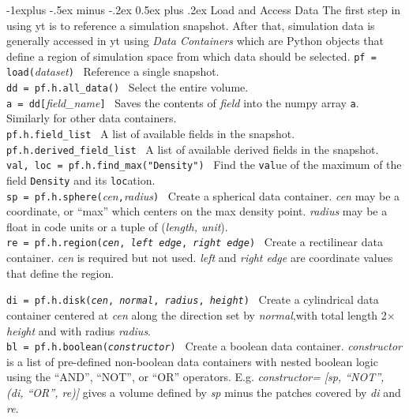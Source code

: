 \documentclass[10pt,landscape]{article}
\makeatletter
\renewcommand{\subsection}{\@startsection{subsection}{2}{0mm}%
                                {-1explus -.5ex minus -.2ex}%
                                {0.5ex plus .2ex}%
                                {\normalfont\normalsize\bfseries}}
\makeatother
\begin{document}
\begin{multicols}{3}
\subsection{Load and Access Data}
The first step in using yt is to reference a simulation snapshot.
After that, simulation data is generally accessed in yt using {\it Data Containers} which are Python objects
that define a region of simulation space from which data should be selected.
\texttt{pf = load(}{\it dataset}\texttt{)} \textemdash\   Reference a single snapshot.\\
\texttt{dd = pf.h.all\_data()} \textemdash\ Select the entire volume.\\
\texttt{a = dd[}{\it field\_name}\texttt{]} \textemdash\ Saves the contents of {\it field} into the
numpy array \texttt{a}. Similarly for other data containers.\\
\texttt{pf.h.field\_list} \textemdash\ A list of available fields in the snapshot. \\
\texttt{pf.h.derived\_field\_list} \textemdash\ A list of available derived fields
in the snapshot. \\
\texttt{val, loc = pf.h.find\_max("Density")} \textemdash\ Find the \texttt{val}ue of
the maximum of the field \texttt{Density} and its \texttt{loc}ation. \\
\texttt{sp = pf.h.sphere(}{\it cen}\texttt{,}{\it radius}\texttt{)} \textemdash\   Create a spherical data 
container. {\it cen} may be a coordinate, or ``max'' which 
centers on the max density point. {\it radius} may be a float in 
code units or a tuple of ({\it length, unit}).\\

\texttt{re = pf.h.region({\it cen}, {\it left edge}, {\it right edge})} \textemdash\ Create a
rectilinear data container. {\it cen} is required but not used.
{\it left} and {\it right edge} are coordinate values that define the region.

\texttt{di = pf.h.disk({\it cen}, {\it normal}, {\it radius}, {\it height})} \textemdash\ 
Create a cylindrical data container centered at {\it cen} along the 
direction set by {\it normal},with total length
 2$\times${\it height} and with radius {\it radius}. \\
 
 \texttt{bl = pf.h.boolean({\it constructor})} \textemdash\ Create a boolean data
 container. {\it constructor} is a list of pre-defined non-boolean 
 data containers with nested boolean logic using the
 ``AND'', ``NOT'', or ``OR'' operators. E.g. {\it constructor=}
 {\it [sp, ``NOT'', (di, ``OR'', re)]} gives a volume defined
 by {\it sp} minus the patches covered by {\it di} and {\it re}.\\
 

\end{multicols}
\end{document}
